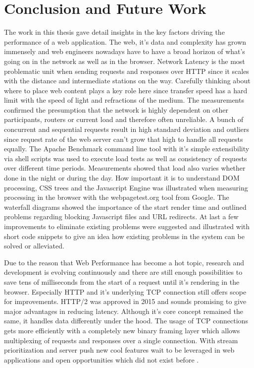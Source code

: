 \chapter{Conclusion and Future Work}
\label{chap:conclusion}

The work in this thesis gave detail insights in the key factors driving the performance of a web application. The web, it's data and complexity has grown immensely and web engineers nowadays have to have a broad horizon of what's going on in the network as well as in the browser. Network Latency is the most problematic unit when sending requests and responses over HTTP since it scales with the distance and intermediate stations on the way. Carefully thinking about where to place web content plays a key role here since transfer speed has a hard limit with the speed of light and refractions of the medium. The measurements confirmed the presumption that the network is highly dependent on other participants, routers or current load and therefore often unreliable. A bunch of concurrent and sequential requests result in high standard deviation and outliers since request rate of the web server can't grow that high to handle all requests equally. The Apache Benchmark command line tool with it's simple extensibility via shell scripts was used to execute load tests as well as consistency of requests over different time periods. Measurements showed that load also varies whether done in the night or during the day. How important it is to understand DOM processing, CSS trees and the Javascript Engine was illustrated when measuring processing in the browser with the webpagetest.org tool from Google. The waterfall diagrams showed the importance of the start render time and outlined problems regarding blocking Javascript files and URL redirects. At last a few improvements to eliminate existing problems were suggested and illustrated with short code snippets to give an idea how existing problems in the system can be solved or alleviated.

Due to the reason that Web Performance has become a hot topic, research and development is evolving continuously and there are still enough possibilities to save tens of milliseconds from the start of a request until it's rendering in the browser. Especially HTTP and it's underlying TCP connection still offers scope for improvements. HTTP/2 was approved in 2015 and sounds promising to give major advantages in reducing latency. Although it's core concept remained the same, it handles data differently under the hood. The usage of TCP connections gets more efficiently with a completely new binary framing layer which allows multiplexing of requests and responses over a single connection. With stream prioritization and server push new cool features wait to be leveraged in web applications and open opportunities which did not exist before \cite{Grigorik_2015}.


